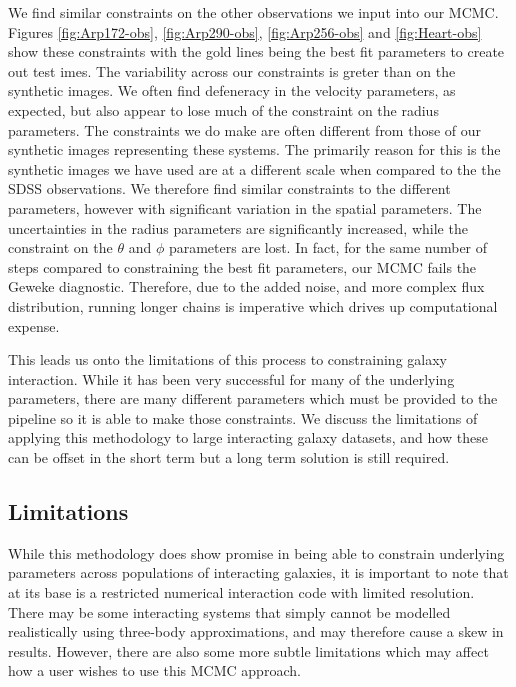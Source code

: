 We find similar constraints on the other observations we input into our MCMC. Figures \ref{fig:Arp172-obs}, \ref{fig:Arp290-obs}, \ref{fig:Arp256-obs} and \ref{fig:Heart-obs} show these constraints with the gold lines being the best fit parameters to create out test imes. The variability across our constraints is greter than on the synthetic images. We often find defeneracy in the velocity parameters, as expected, but also appear to lose much of the constraint on the radius parameters. The constraints we do make are often different from those of our synthetic images representing these systems. The primarily reason for this is the synthetic images we have used are at a different scale when compared to the the SDSS observations. We therefore find similar constraints to the different parameters, however with significant variation in the spatial parameters. The uncertainties in the radius parameters are significantly increased, while the constraint on the $\theta$ and $\phi$ parameters are lost. In fact, for the same number of steps compared to constraining the best fit parameters, our MCMC fails the Geweke diagnostic. Therefore, due to the added noise, and more complex flux distribution, running longer chains is imperative which drives up computational expense.

This leads us onto the limitations of this process to constraining galaxy interaction. While it has been very successful for many of the underlying parameters, there are many different parameters which must be provided to the pipeline so it is able to make those constraints. We discuss the limitations of applying this methodology to large interacting galaxy datasets, and how these can be offset in the short term but a long term solution is still required.

\subsection{Limitations}\label{limitations}
\noindent While this methodology does show promise in being able to constrain underlying parameters across populations of interacting galaxies, it is important to note that at its base is a restricted numerical interaction code with limited resolution. There may be some interacting systems that simply cannot be modelled realistically using three-body approximations, and may therefore cause a skew in results. However, there are also some more subtle limitations which may affect how a user wishes to use this MCMC approach.

